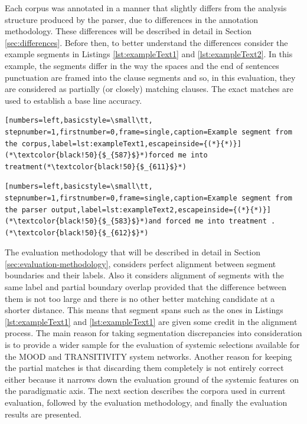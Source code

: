     Each corpus was annotated in a manner that slightly differs from the analysis structure produced by the parser, due to differences in the annotation methodology. These differences will be described in detail in Section \ref{sec:differences}. Before then, to better understand the differences consider the example segments in Listings \ref{lst:exampleText1} and \ref{lst:exampleText2}. In this example, the segments differ in the way the spaces and the end of sentences punctuation are framed into the clause segments and so, in this evaluation, they are considered as partially (or closely) matching clauses. The exact matches are used to establish a base line accuracy. 
    
\noindent
\begin{minipage}{\linewidth}
\begin{lstlisting}[numbers=left,basicstyle=\small\tt, stepnumber=1,firstnumber=0,frame=single,caption=Example segment from the corpus,label=lst:exampleText1,escapeinside={(*}{*)}]
(*\textcolor{black!50}{$_{587}$}*)forced me into treatment(*\textcolor{black!50}{$_{611}$}*)
\end{lstlisting}
\end{minipage}

\noindent
\begin{minipage}{\linewidth}
\begin{lstlisting}[numbers=left,basicstyle=\small\tt, stepnumber=1,firstnumber=0,frame=single,caption=Example segment from the parser output,label=lst:exampleText2,escapeinside={(*}{*)}]
(*\textcolor{black!50}{$_{583}$}*)and forced me into treatment .(*\textcolor{black!50}{$_{612}$}*)
\end{lstlisting}
\end{minipage}    

    The evaluation methodology that will be described in detail in Section \ref{sec:evaluation-methodology}, considers perfect alignment between segment boundaries and their labels. Also it considers alignment of segments with the same label and partial boundary overlap provided that the difference between them is not too large and there is no other better matching candidate at a shorter distance. This means that segment spans such as the ones in Listings \ref{lst:exampleText1} and \ref{lst:exampleText1} are given some credit in the alignment process. The main reason for taking segmentation discrepancies into consideration is to provide a wider sample for the evaluation of systemic selections available for the MOOD and TRANSITIVITY system networks. Another reason for keeping the partial matches is that discarding them completely is not entirely correct either because it narrows down the evaluation ground of the systemic features on the paradigmatic axis. The next section describes the corpora used in current evaluation, followed by the evaluation methodology, and finally the evaluation results are presented.

